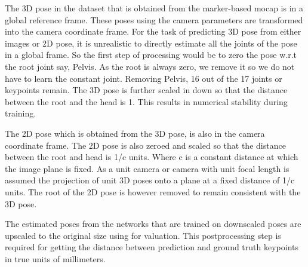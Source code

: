 The 3D pose in the dataset that is obtained from the marker-based \ac{mocap} is in a global reference frame. These poses using the camera parameters are transformed into the camera coordinate frame. For the task of predicting 3D pose from either images or 2D pose, it is unrealistic to directly estimate all the joints of the pose in a global frame. So the first step of processing would be to zero the pose w.r.t the root joint say, Pelvis. As the root is always zero, we remove it so we do not have to learn the constant joint. Removing Pelvis, 16 out of the 17 joints or keypoints remain. The 3D pose is further scaled in down so that the distance between the root and the head is 1. This results in numerical stability during training.


The 2D pose which is obtained from the 3D pose, is also in the camera coordinate frame. The 2D pose is also zeroed and scaled so that the distance between the root and head is 1/c units. Where c is a constant distance at which the image plane is fixed. As a unit camera or camera with unit focal length is assumed the projection of unit 3D poses onto a plane at a fixed distance of 1/c units. The root of the 2D pose is however removed to remain consistent with the 3D pose.


The estimated poses from the networks that are trained on downscaled poses are upscaled to the original size using for valuation. This postprocessing step is required for getting the distance between prediction and ground truth keypoints in true units of millimeters.

